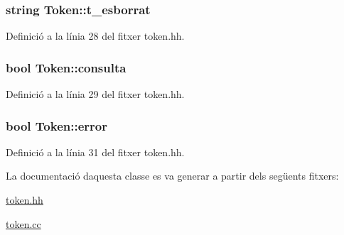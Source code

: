 \hypertarget{class_token_a4ebbfc5ad34b5a4e9220789cbf0dfafe}{}
\subsubsection[{t\+\_\+esborrat}]{\setlength{\rightskip}{0pt plus 5cm}string Token\+::t\+\_\+esborrat\hspace{0.3cm}{\ttfamily [private]}}\label{class_token_a4ebbfc5ad34b5a4e9220789cbf0dfafe}


Definició a la línia 28 del fitxer token.\+hh.

\hypertarget{class_token_a4479e876476db5ccd360ad3906d47eff}{}
\subsubsection[{consulta}]{\setlength{\rightskip}{0pt plus 5cm}bool Token\+::consulta\hspace{0.3cm}{\ttfamily [private]}}\label{class_token_a4479e876476db5ccd360ad3906d47eff}


Definició a la línia 29 del fitxer token.\+hh.

\hypertarget{class_token_a087a46025ff3eb94c844aba0204ce08a}{}
\subsubsection[{error}]{\setlength{\rightskip}{0pt plus 5cm}bool Token\+::error\hspace{0.3cm}{\ttfamily [private]}}\label{class_token_a087a46025ff3eb94c844aba0204ce08a}


Definició a la línia 31 del fitxer token.\+hh.



La documentació d\textquotesingle{}aquesta classe es va generar a partir dels següents fitxers\+:\begin{DoxyCompactItemize}
\item 
\hyperlink{token_8hh}{token.\+hh}\item 
\hyperlink{token_8cc}{token.\+cc}\end{DoxyCompactItemize}
